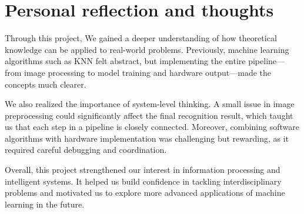 \documentclass{article}
\begin{document}
\section{Personal reflection and thoughts}
Through this project, We gained a deeper understanding of how theoretical knowledge can be applied to real-world problems. Previously, machine learning algorithms such as KNN felt abstract, but implementing the entire pipeline—from image processing to model training and hardware output—made the concepts much clearer.

We also realized the importance of system-level thinking. A small issue in image preprocessing could significantly affect the final recognition result, which taught us that each step in a pipeline is closely connected. Moreover, combining software algorithms with hardware implementation was challenging but rewarding, as it required careful debugging and coordination.

Overall, this project strengthened our interest in information processing and intelligent systems. It helped us build confidence in tackling interdisciplinary problems and motivated us to explore more advanced applications of machine learning in the future.
\end{document}
